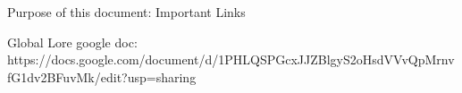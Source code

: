 

Purpose of this document: Important Links

Global Lore google doc: https://docs.google.com/document/d/1PHLQSPGcxJJZBlgyS2oHsdVVvQpMrnvfG1dv2BFuvMk/edit?usp=sharing


